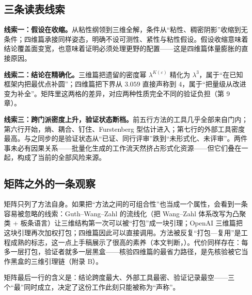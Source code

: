 \subsection{三条读表线索}

\textbf{线索一：假设在收缩。}从粘性纲领到三维全解，条件从“粘性、稠密阴影”收缩到无条件；四维篇承接同样姿态，明确不设可测性、紧性与粘性假设。假设收缩意味着结论覆盖面变宽，也意味着证明必须处理更野的配置——这是四维篇体量膨胀的直接原因。

\textbf{线索二：结论在精确化。}三维篇把遗留的密度幂 $\lambda^{K(\varepsilon)}$ 精化为 $\lambda^{3}$，属于“在已知框架内把最优点补圆”；四维篇把下界从 $3.059$ 直接声称到 $4$，属于“把量级从改进变为补全”。矩阵里这两格的差异，对应两种性质完全不同的验证负担（第 9 章）。

\textbf{线索三：跨门派密度上升，验证状态断档。}前五行方法的工具几乎全部来自门内；第六行开始，熵、耦合、钉住、Furstenberg 型估计进入；第七行的外部工具密度最高。与之同步的是验证状态从“已证、同行评审”跌到“未形式化、未评审”。两件事未必有因果关系——批量化生成的工作流天然挤占形式化资源——但它们叠在一起，构成了当前的全部风险来源。

\subsection{矩阵之外的一条观察}

矩阵只列了方法自身。如果把“方法之间的可组合性”也当成一个属性，会看到一条容易被忽略的线索：Guth--Wang--Zahl 的流线化（把 Wang--Zahl 体系改写为凸聚类 + 板条语言）让三维结构第一次可以被“打包”成一块引理；OpenAI 三维篇把这块引理再次加权打包；四维篇因此可以直接调用。方法被反复“打包—复用”是工程成熟的标志，这一点上手稿展示了很高的素养（本文判断，\cfM）。代价同样存在：每多一层打包，验证者就多一层黑盒——核验四维篇的最省力路径，是先核验被它当作黑盒的三维引理链（附录 B）。

\begin{keybox}[可记忆主句]
矩阵最后一行的含义是：结论跨度最大、外部工具最密、验证记录最空——三个“最”同时成立，决定了这份工作此刻只能被称为“声称”。
\end{keybox}